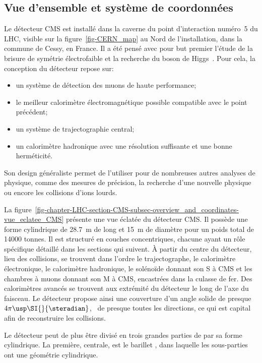 \subsection{Vue d'ensemble et système de coordonnées}\label{chapter-LHC-section-CMS-subsec-overview_and_coordinates}
Le détecteur CMS est installé dans la caverne du point d'interaction numéro~5 du LHC, visible sur la figure~\ref{fig-CERN_map} au Nord de l'installation, dans la commune de Cessy, en France.
Il a été pensé avec pour but premier l'étude de la brisure de symétrie électrofaible et la recherche du boson de Higgs~\cite{cms_letter_intent}.
Pour cela, la conception du détecteur repose sur:
\begin{itemize}
\item un système de détection des muons de haute performance;
\item le meilleur calorimètre électromagnétique possible compatible avec le point précédent;
\item un système de trajectographie central;
\item un calorimètre hadronique avec une résolution suffisante et une bonne herméticité.
\end{itemize}
Son design généraliste permet de l'utiliser pour de nombreuses autres analyses de physique, comme des mesures de précision, la recherche d'une nouvelle physique ou encore les collisions d'ions lourds.
\par La figure~\ref{fig-chapter-LHC-section-CMS-subsec-overview_and_coordinates-vue_eclatee_CMS} présente une vue éclatée du détecteur CMS.
Il possède une forme cylindrique de \SI{28.7}{\meter} de long et \SI{15}{\meter} de diamètre pour un poids total de \num{14000} tonnes.
Il est structuré en couches concentriques, chacune ayant un rôle spécifique détaillé dans les sections qui suivent.
À partir du centre du détecteur, lieu des collisions, se trouvent dans l'ordre
le trajectographe,
le calorimètre électronique,
le calorimètre hadronique,
le solénoïde donnant son \og S \fg{} à CMS et
les chambres à muons donnant son \og M \fg{} à CMS, encastrées dans la culasse de fer.
Des calorimètres avancés se trouvent aux extrémité du détecteur le long de l'axe du faisceau.
Le détecteur propose ainsi une couverture d'un angle solide de presque $4\pi\usp\SI{}{\steradian}$, \ie\ de presque toutes les directions, ce qui est capital afin de reconstruire les collisions.
\par Le détecteur peut de plus être divisé en trois grandes parties de par sa forme cylindrique.
La première, centrale, est le \og barillet \fg, dans laquelle les sous-parties ont une géométrie cylindrique.
